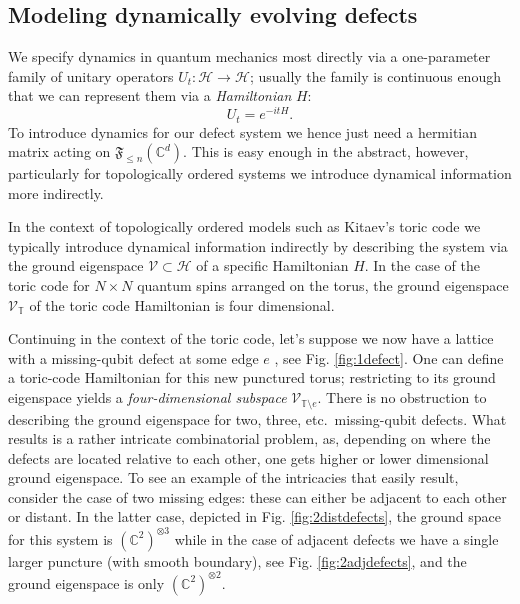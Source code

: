 \documentclass[aps,prx,twocolumn,superscriptaddress,noshowkeys]{revtex4-2}  %
\theoremstyle{plain}%
\theoremstyle{definition}
\theoremstyle{remark}
\begin{document}
\subsection{Modeling dynamically evolving defects}
We specify dynamics in quantum mechanics most directly via a one-parameter family of unitary operators $U_t:\mathcal{H}\rightarrow\mathcal{H}$; usually the family is continuous enough that we can represent them via a \emph{Hamiltonian} $H$:
\begin{equation}
U_t = e^{-it H}.
\end{equation}
To introduce dynamics for our defect system we hence just need a hermitian matrix acting on $\mathfrak{F}_{\le n}(\mathbb{C}^d)$. This is easy enough in the abstract, however, particularly for topologically ordered systems we introduce dynamical information more indirectly.

In the context of topologically ordered models such as Kitaev's toric code \cite{Kit03} we typically introduce dynamical information indirectly by describing the system via the ground eigenspace $\mathcal{V}\subset \mathcal{H}$ of a specific Hamiltonian $H$. In the case of the toric code for $N\times N$ quantum spins arranged on the torus, the ground eigenspace $\mathcal{V}_{\mathbb{T}}$ of the toric code Hamiltonian is four dimensional.

Continuing in the context of the toric code, let's suppose we now have a lattice with a missing-qubit defect at some edge $e$ \cite{BLKW17}, see Fig. \ref{fig:1defect}. One can define a toric-code Hamiltonian for this new punctured torus; restricting to its ground eigenspace yields a \emph{four-dimensional subspace} $\mathcal{V}_{\mathbb{T}\setminus e}$. There is no obstruction to describing the ground eigenspace for two, three, etc.\ missing-qubit defects. What results is a rather intricate combinatorial problem, as, depending on where the defects are located relative to each other, one gets higher or lower dimensional ground eigenspace. To see an example of the intricacies that easily result, consider the case of two missing edges: these can either be adjacent to each other or distant. In the latter case, depicted in Fig. \ref{fig:2distdefects}, the ground space for this system is $(\mathbb{C}^2)^{\otimes 3}$ while in the case of adjacent defects we have a single larger puncture (with smooth boundary), see Fig. \ref{fig:2adjdefects}, and the ground eigenspace is only $(\mathbb{C}^2)^{\otimes 2}$.
\end{document}
